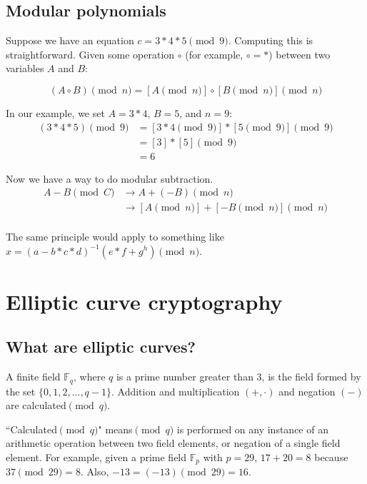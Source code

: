 \subsection{Modular polynomials}
\label{subsec:modular-polynomials}

Suppose we have an equation $c = 3*4*5 \pmod 9$. Computing this is straightforward. Given some operation $\circ$ (for example, $\circ = *$) between two variables $A$ and $B$:

\[ (A \circ B)\pmod{n} = {[A\pmod {n}] \circ [B\pmod{n}]}\pmod{n} \]

In our example, we set $A = 3*4$, $B = 5$, and $n = 9$:
\begin{align*}
(3*4 * 5) \pmod{9} &= {[3*4 \pmod {9}] * [5 \pmod{9}]} \pmod{9} \\
				   &= [3]*[5] \pmod 9 \\
				   &= 6
\end{align*}

Now we have a way to do modular subtraction.
\begin{align*}
A - B \pmod C &\rightarrow A + (-B) \pmod n \\
			  &\rightarrow {[A \pmod {n}] + [-B \pmod{n}]} \pmod{n}
\end{align*}\\

The same principle would apply to something like $x = (a-b*c*d)^{-1} (e*f+g^{h}) \pmod n$.



\section{Elliptic curve cryptography}
\label{EllipticCurveCryptography}

\subsection{What are elliptic curves?}
\label{elliptic_curves_section}

A finite field \(\mathbb{F}_q\), where \(q\) is a prime number greater than 3, is the field formed by the set \(\{0, 1, 2, ..., q-1\}\). Addition and multiplication \((+,  \cdot)\) and negation $(-)$ are calculated\( \pmod q\). 

``Calculated\( \pmod q\)" means\( \pmod q\) is performed on any instance of an arithmetic operation between two field elements, or negation of a single field element. For example, given a prime field \(\mathbb{F}_p\) with $p = 29$, $17+20=8$ because $37 \pmod{29} = 8$. Also, $-13 = (-13) \pmod{29} = 16$.\\

